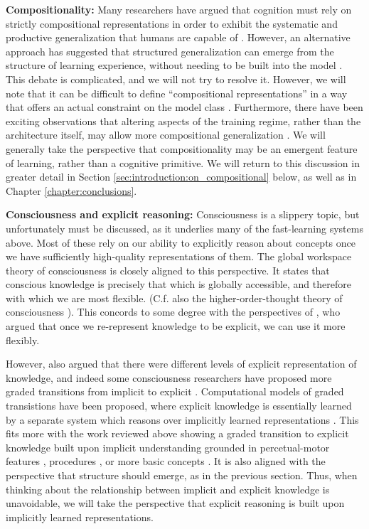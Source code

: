 \textbf{Compositionality:} Many researchers have argued that cognition must rely on strictly compositional representations in order to exhibit the systematic and productive generalization that humans are capable of \citep[e.g.][]{Fodor2001, Fodor2008lot2, Lake2017}. However, an alternative approach has suggested that structured generalization can emerge from the structure of learning experience, without needing to be built into the model \citep{McClelland2010, Hansen2017}. This debate is complicated, and we will not try to resolve it. However, we will note that it can be difficult to define ``compositional representations'' in a way that offers an actual constraint on the model class \citep[c.f.][]{Zadrozny1992}. Furthermore, there have been exciting observations that altering aspects of the training regime, rather than the architecture itself, may allow more compositional generalization \citep{Hill2019a}. We will generally take the perspective that compositionality may be an emergent feature of learning, rather than a cognitive primitive. We will return to this discussion in greater detail in Section \ref{sec:introduction:on_compositional} below, as well as in Chapter \ref{chapter:conclusions}.\par
\textbf{Consciousness and explicit reasoning:} Consciousness is a slippery topic, but unfortunately must be discussed, as it underlies many of the fast-learning systems above. Most of these rely on our ability to explicitly reason about concepts once we have sufficiently high-quality representations of them. The global workspace theory of consciousness \citep{Baars2005, Dehaene2017} is closely aligned  to this perspective. It states that conscious knowledge is precisely that which is globally accessible, and therefore with which we are most flexible. (C.f. also the higher-order-thought theory of consciousness \citep{Rosenthal1990}). This concords to some degree with the perspectives of \citet{Karmiloff-Smith1986}, who argued that once we re-represent knowledge to be explicit, we can use it more flexibly. \par
However, \citet{Karmiloff-Smith1986} also argued that there were different levels of explicit representation of knowledge, and indeed some consciousness researchers have proposed more graded transitions from implicit to explicit \citep[e.g.][]{Cleeremans2002}. Computational models of graded transistions have been proposed, where explicit knowledge is essentially learned by a separate system which reasons over implicitly learned representations \citep{Cleeremans2014}. This fits more with the work reviewed above showing a graded transition to explicit knowledge built upon implicit understanding grounded in percetual-motor features \citep[e.g.][]{Goldin-Meadow1993}, procedures \citep[e.g.][]{Hazzan1999}, or more basic concepts \citep{Wilensky1991, Patel2018}. It is also aligned with the perspective that structure should emerge, as in the previous section. Thus, when thinking about the relationship between implicit and explicit knowledge is unavoidable, we will take the perspective that explicit reasoning is built upon implicitly learned representations. \par 
